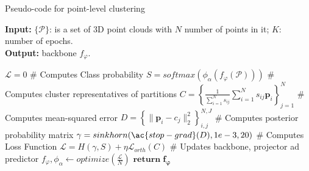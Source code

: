 \begin{algorithm}[H]
    \caption{Pseudo-code for point-level clustering}\label{alg:point_level}
    \textbf{Input:} $\{\mathcal{P}\}$: is a set of 3D point clouds with $\mathit{N}$ number of points in it; $\mathit{K}$: number of epochs. \\
    \textbf{Output:} backbone $f_{\varphi}$.
    \begin{algorithmic}[1]
            \State $\mathcal{L} = 0$
                \State \# Computes Class probability
                \State $ S = softmax(\phi_{\alpha}(f_{\varphi}(\mathcal{P})))$
                \State \# Computes cluster representatives of partitions
                \State $ C = \left\{ \frac{1}{\sum_{i=1}^{N}s_{ij}} \sum_{i=1}^{N}s_{ij}\mathbf{p}_i \right\}_{j=1}^N$
                \State \# Computes mean-squared error 
                \State $ D = \left\{ \lVert \mathbf{p}_i - c_j \rVert _2^2 \right\} _{i,j}^{N,J}$
                \State \# Computes posterior probability matrix
                \State $\gamma = sinkhorn(\ac{stop-grad}(D), 1e - 3, 20)$
                \State \# Computes Loss Function 
                \State $\mathcal{L} = H(\gamma,S) + \eta \mathcal{L}_{orth}(C)$
            \EndFor
            \State \# Updates backbone, projector ad predictor
            \State $ f_{\varphi}, \phi_{\alpha} \gets optimize(\frac{\mathcal{L}}{N})$
        \EndFor
        \State $\mathbf{return \; f_{\varphi}}$          
    \end{algorithmic}
\end{algorithm}

